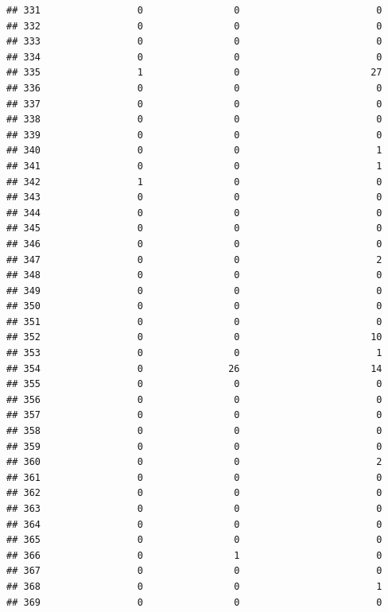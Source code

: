 \documentclass[
]{article}
\begin{document}
\begin{verbatim}
## 331                 0                0                        0
## 332                 0                0                        0
## 333                 0                0                        0
## 334                 0                0                        0
## 335                 1                0                       27
## 336                 0                0                        0
## 337                 0                0                        0
## 338                 0                0                        0
## 339                 0                0                        0
## 340                 0                0                        1
## 341                 0                0                        1
## 342                 1                0                        0
## 343                 0                0                        0
## 344                 0                0                        0
## 345                 0                0                        0
## 346                 0                0                        0
## 347                 0                0                        2
## 348                 0                0                        0
## 349                 0                0                        0
## 350                 0                0                        0
## 351                 0                0                        0
## 352                 0                0                       10
## 353                 0                0                        1
## 354                 0               26                       14
## 355                 0                0                        0
## 356                 0                0                        0
## 357                 0                0                        0
## 358                 0                0                        0
## 359                 0                0                        0
## 360                 0                0                        2
## 361                 0                0                        0
## 362                 0                0                        0
## 363                 0                0                        0
## 364                 0                0                        0
## 365                 0                0                        0
## 366                 0                1                        0
## 367                 0                0                        0
## 368                 0                0                        1
## 369                 0                0                        0

\end{verbatim}
\end{document}
